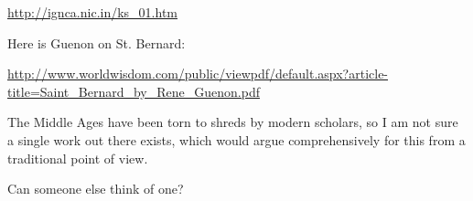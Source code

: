 \begin{footnotesize}
\begin{sffamily}
\url{http://ignca.nic.in/ks\_01.htm}

Here is Guenon on St. Bernard:

\url{http://www.worldwisdom.com/public/viewpdf/default.aspx?article-title=Saint\_Bernard\_by\_Rene\_Guenon.pdf}

The Middle Ages have been torn to shreds by modern scholars, so I am not sure a single work out there exists, which would argue comprehensively for this from a traditional point of view.

Can someone else think of one?


\hfill

\end{sffamily}
\end{footnotesize}

